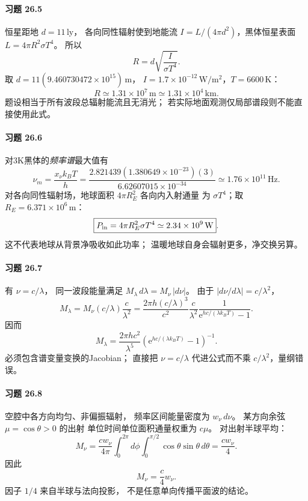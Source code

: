 \paragraph{习题 26.5}
恒星距地 \(d=11\,\mathrm{ly}\)，
各向同性辐射使到地能流
\(I=L/(4\pi d^2)\)，黑体恒星表面
\(L=4\pi R^2\sigma T^4\)。
所以
\[
\boxed{R=d\sqrt{\frac{I}{\sigma T^4}}}.
\]
取 \(d=11(9.460730472\times10^{15})\,\mathrm m\)，
\(I=1.7\times10^{-12}\,\mathrm{W/m^2}\)，\(T=6600\,\mathrm K\)：
\[
\boxed{R\simeq1.31\times10^7\,\mathrm m
\simeq1.31\times10^4\,\mathrm{km}}.
\]
题设相当于所有波段总辐射能流且无消光；
若实际地面观测仅局部谱段则不能直接使用此式。

\paragraph{习题 26.6}
对3K黑体的\emph{频率谱}最大值有
\[
\boxed{\nu_m=\frac{x_\nu k_BT}{h}
=\frac{2.821439(1.380649\times10^{-23})(3)}
{6.62607015\times10^{-34}}
\simeq1.76\times10^{11}\,\mathrm{Hz}}.
\]
对各向同性辐射场，地球面积
\(4\pi R_E^2\) 各向内入射通量
为 \(\sigma T^4\)；取 \(R_E=6.371\times10^6\,\mathrm m\)：
\[
\boxed{P_{\rm in}=4\pi R_E^2\sigma T^4
\simeq2.34\times10^9\,\mathrm W}.
\]
这不代表地球从背景净吸收如此功率；
温暖地球自身会辐射更多，净交换另算。

\paragraph{习题 26.7}
有 \(\nu=c/\lambda\)，
同一波段能量满足
\(M_\lambda\,d\lambda=M_\nu\,|d\nu|\)。
由于 \(|d\nu/d\lambda|=c/\lambda^2\)，
\[
M_\lambda
=M_\nu(c/\lambda)\frac c{\lambda^2}
=\frac{2\pi h(c/\lambda)^3}{c^2}
\frac{c}{\lambda^2}
\frac1{\mathrm e^{hc/(\lambda k_BT)}-1}.
\]
因而
\[
\boxed{M_\lambda
=\frac{2\pi hc^2}{\lambda^5}
\left(\mathrm e^{hc/(\lambda k_BT)}-1\right)^{-1}}.
\]
必须包含谱变量变换的Jacobian；
直接把 \(\nu=c/\lambda\) 代进公式而不乘
\(c/\lambda^2\)，量纲错误。

\paragraph{习题 26.8}
空腔中各方向均匀、非偏振辐射，
频率区间能量密度为 \(w_\nu\,d\nu\)。
某方向余弦 \(\mu=\cos\theta>0\) 的出射
单位时间单位面积通量权重为 \(c\mu\)。
对出射半球平均：
\[
M_\nu=\frac{c w_\nu}{4\pi}
\int_0^{2\pi}d\phi\int_0^{\pi/2}
\cos\theta\sin\theta\,d\theta
=\frac{c w_\nu}{4}.
\]
因此
\[
\boxed{M_\nu=\frac c4w_\nu}.
\]
因子 \(1/4\) 来自半球与法向投影，
不是任意单向传播平面波的结论。

